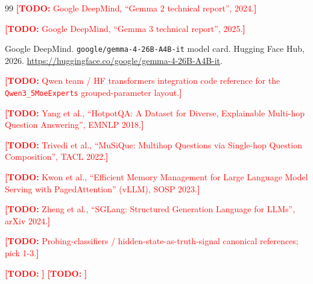 \documentclass[11pt,letterpaper]{article}
\newcommand{\TODO}[1]{\textcolor{red}{\textbf{[TODO:} #1\textbf{]}}}
\begin{document}
\begin{thebibliography}{99}
\TODO{Google DeepMind, ``Gemma 2 technical report'', 2024.}

\TODO{Google DeepMind, ``Gemma 3 technical report'', 2025.}

Google DeepMind.
\newblock \texttt{google/gemma-4-26B-A4B-it} model card.
\newblock Hugging Face Hub, 2026.
\newblock \url{https://huggingface.co/google/gemma-4-26B-A4B-it}.

\TODO{Qwen team / HF transformers integration code reference for the
\texttt{Qwen3\_5MoeExperts} grouped-parameter layout.}

\TODO{Yang et al., ``HotpotQA: A Dataset for Diverse, Explainable
Multi-hop Question Answering'', EMNLP 2018.}

\TODO{Trivedi et al., ``MuSiQue: Multihop Questions via Single-hop
Question Composition'', TACL 2022.}

\TODO{Kwon et al., ``Efficient Memory Management for Large Language
Model Serving with PagedAttention'' (vLLM), SOSP 2023.}

\TODO{Zheng et al., ``SGLang: Structured Generation Language for LLMs'',
arXiv 2024.}

\TODO{Probing-classifiers / hidden-state-as-truth-signal canonical
references; pick 1-3.}

\TODO{}
\TODO{}

\end{thebibliography}
\end{document}
